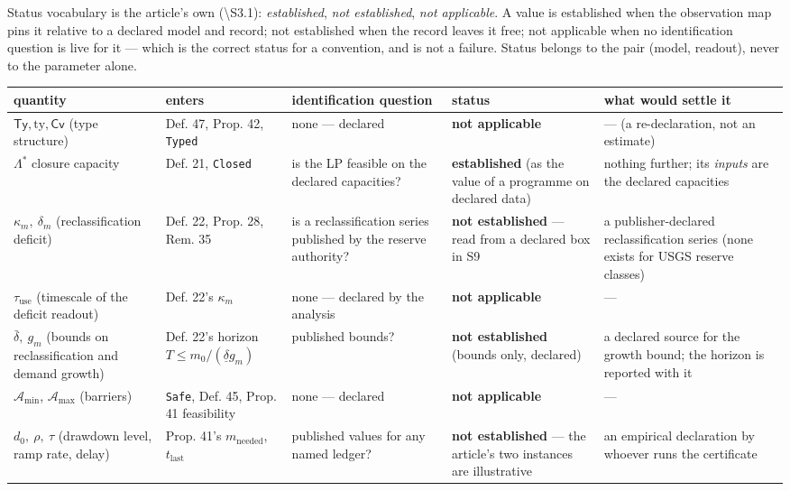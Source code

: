 \documentclass[11pt]{article}
\begin{document}
Status vocabulary is the article's own (\textbackslash{}S{}3.1): \emph{established}, \emph{not established}, \emph{not applicable}. A value is established when the observation map pins it relative to a declared model and record; not established when the record leaves it free; not applicable when no identification question is live for it --- which is the correct status for a convention, and is not a failure. Status belongs to the pair (model, readout), never to the parameter alone.

\begin{longtable}{@{}p{39mm}|p{39mm}|p{39mm}|p{39mm}|p{39mm}@{}}
\toprule
quantity & enters & identification question & status & what would settle it \\
\midrule
\(\mathsf{Ty}, \mathrm{ty}, \mathsf{Cv}\) (type structure) & Def. 47, Prop. 42, \texttt{Typed} & none --- declared & \textbf{not applicable} & --- (a re-declaration, not an estimate) \\
\(\Lambda^{*}\) closure capacity & Def. 21, \texttt{Closed} & is the LP feasible on the declared capacities? & \textbf{established} (as the value of a programme on declared data) & nothing further; its \emph{inputs} are the declared capacities \\
\(\kappa_m,\ \delta_m\) (reclassification deficit) & Def. 22, Prop. 28, Rem. 35 & is a reclassification series published by the reserve authority? & \textbf{not established} --- read from a declared box in S9 & a publisher-declared reclassification series (none exists for USGS reserve classes) \\
\(\tau_{\mathrm{use}}\) (timescale of the deficit readout) & Def. 22's \(\kappa_m\) & none --- declared by the analysis & \textbf{not applicable} & --- \\
\(\bar\delta,\ g_m\) (bounds on reclassification and demand growth) & Def. 22's horizon \(T \le m_0/(\underline\delta g_m)\) & published bounds? & \textbf{not established} (bounds only, declared) & a declared source for the growth bound; the horizon is reported with it \\
\(\mathcal A_{\min}\), \(\mathcal A_{\max}\) (barriers) & \texttt{Safe}, Def. 45, Prop. 41 feasibility & none --- declared & \textbf{not applicable} & --- \\
\(d_0,\ \rho,\ \tau\) (drawdown level, ramp rate, delay) & Prop. 41's \(m_{\mathrm{needed}}\), \(t_{\mathrm{last}}\) & published values for any named ledger? & \textbf{not established} --- the article's two instances are illustrative & an empirical declaration by whoever runs the certificate \\

\end{longtable}
\end{document}
